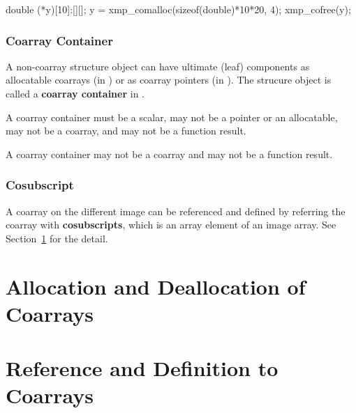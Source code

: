 \begin{center}
 \begin{minipage}{0.70\hsize}
  \begin{XCexampleR}
  double (*y)[10]:[][];
  y = xmp_comalloc(sizeof(double)*10*20, 4);
  xmp_cofree(y);
  \end{XCexampleR}
 \end{minipage}
\end{center}


\subsubsection*{Coarray Container}

A non-coarray structure object can have ultimate (leaf) components as 
allocatable coarrays (in {\XMPF}) or as coarray pointers (in {\XMPC}).
The strucure object is called a {\bf coarray container} in {\XMP}.

{\onlyF} A coarray container must be a scalar, may not be a pointer
or an allocatable, may not be a coarray, and may not be a function result.

{\onlyC} A coarray container may not be a coarray and may not be a function
result.


\subsubsection*{Cosubscript}
A coarray on the different image can be referenced and defined
by referring the coarray with {\bf cosubscripts}, which
is an array element of an image array.
See Section~\ref{sec:Allocation and Deallocation of Coarrays} for the detail.






\section{Allocation and Deallocation of Coarrays}
\label{sec:Allocation and Deallocation of Coarrays}

\section{Reference and Definition to Coarrays}
\label{sec:Reference and Definition to Coarrays}


